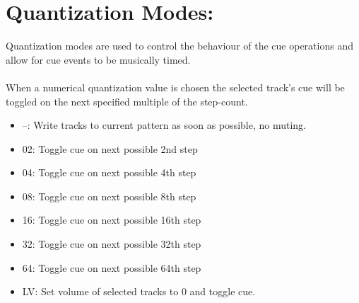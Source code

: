  \section{Quantization Modes:}
 Quantization modes are used to control the behaviour of the cue operations and allow for cue events to be musically timed.\\
 \\
 When a numerical quantization value is chosen the selected track’s cue will be toggled on the next specified multiple of the step-count.
 \begin{itemize}
\item --: Write tracks to current pattern as soon as possible, no muting.
\item 02: Toggle cue on next possible 2nd step
\item 04: Toggle cue on next possible 4th step
\item 08: Toggle cue on next possible 8th step 
\item 16: Toggle cue on next possible 16th step 
\item 32: Toggle cue on next possible 32th step 
\item 64: Toggle cue on next possible 64th step
\item LV: Set volume of selected tracks to 0 and toggle cue.
 \end{itemize}
 
 